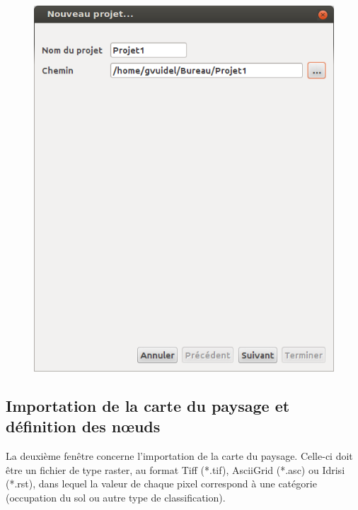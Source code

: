 \documentclass{article}
\begin{document}
\begin{figure}[H]
	\includegraphics[scale=0.5]{img/manual-fr_img2.png} 
\end{figure}

\subsection{Importation de la carte du paysage et définition des nœuds}

La deuxième fenêtre concerne l’importation de la carte du paysage. Celle-ci doit être un fichier de type raster, au format Tiff (*.tif), AsciiGrid (*.asc) ou Idrisi (*.rst), dans lequel la valeur de chaque pixel correspond à une catégorie (occupation du sol ou autre type de classification).
\end{document}
